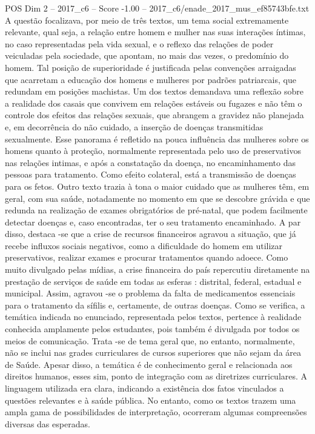 \begin{textsample}{POS Dim 2 – 2017\_c6 – Score -1.00 – 2017\_c6/enade\_2017\_mus\_ef85743bfe.txt}
A questão focalizava, por meio de três textos, um tema social extremamente relevante, qual seja, a relação entre homem e mulher nas suas interações íntimas, no caso representadas pela vida sexual, e o reflexo das relações de poder veiculadas pela sociedade, que apontam, no mais das vezes, o predomínio do homem.
Tal posição de superioridade é justificada pelas convenções arraigadas que acarretam a educação dos homens e mulheres por padrões patriarcais, que redundam em posições machistas.
Um dos textos demandava uma reflexão sobre a realidade dos casais que convivem em relações estáveis ou fugazes e não têm o controle dos efeitos das relações sexuais, que abrangem a gravidez não planejada e, em decorrência do não cuidado, a inserção de doenças transmitidas sexualmente.
Esse panorama é refletido na pouca influência das mulheres sobre os homens quanto à proteção, normalmente representada pelo uso de preservativos nas relações intimas, e após a constatação da doença, no encaminhamento das pessoas para tratamento.
Como efeito colateral, está a transmissão de doenças para os fetos.
Outro texto trazia à tona o maior cuidado que as mulheres têm, em geral, com sua saúde, notadamente no momento em que se descobre grávida e que redunda na realização de exames obrigatórios de pré-natal, que podem facilmente detectar doenças e, caso encontradas, ter o seu tratamento encaminhado.
A par disso, destaca -se que a crise de recursos financeiros agravou a situação, que já recebe influxos sociais negativos, como a dificuldade do homem em utilizar preservativos, realizar exames e procurar tratamentos quando adoece.
Como muito divulgado pelas mídias, a crise financeira do país repercutiu diretamente na prestação de serviços de saúde em todas as esferas : distrital, federal, estadual e municipal.
Assim, agravou -se o problema da falta de medicamentos essenciais para o tratamento da sífilis e, certamente, de outras doenças.
Como se verifica, a temática indicada no enunciado, representada pelos textos, pertence à realidade conhecida amplamente pelos estudantes, pois também é divulgada por todos os meios de comunicação.
Trata -se de tema geral que, no entanto, normalmente, não se inclui nas grades curriculares de cursos superiores que não sejam da área de Saúde.
Apesar disso, a temática é de conhecimento geral e relacionada aos direitos humanos, esses sim, ponto de integração com as diretrizes curriculares.
A linguagem utilizada era clara, indicando a existência dos fatos vinculados a questões relevantes e à saúde pública.
No entanto, como os textos trazem uma ampla gama de possibilidades de interpretação, ocorreram algumas compreensões diversas das esperadas.

\end{textsample}
